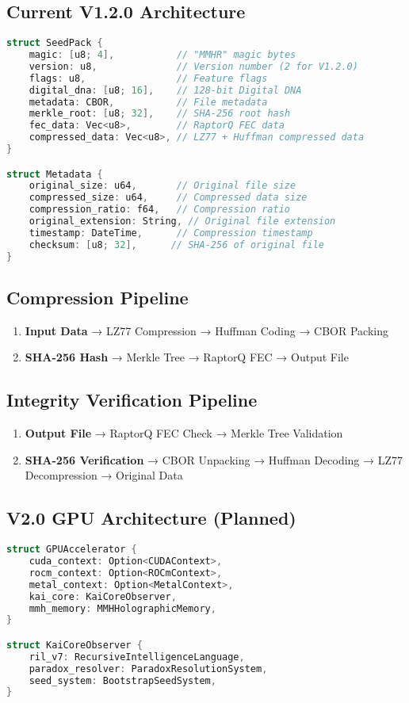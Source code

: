 \documentclass[12pt,a4paper]{article}
\begin{document}
\subsection{Current V1.2.0 Architecture}
\begin{lstlisting}[language=C, caption=Core File Format Structure]
struct SeedPack {
    magic: [u8; 4],           // "MMHR" magic bytes
    version: u8,              // Version number (2 for V1.2.0)
    flags: u8,                // Feature flags
    digital_dna: [u8; 16],    // 128-bit Digital DNA
    metadata: CBOR,           // File metadata
    merkle_root: [u8; 32],    // SHA-256 root hash
    fec_data: Vec<u8>,        // RaptorQ FEC data
    compressed_data: Vec<u8>, // LZ77 + Huffman compressed data
}

struct Metadata {
    original_size: u64,       // Original file size
    compressed_size: u64,     // Compressed data size
    compression_ratio: f64,   // Compression ratio
    original_extension: String, // Original file extension
    timestamp: DateTime,      // Compression timestamp
    checksum: [u8; 32],      // SHA-256 of original file
}
\end{lstlisting}

\subsection{Compression Pipeline}
\begin{enumerate}
    \item \textbf{Input Data} → LZ77 Compression → Huffman Coding → CBOR Packing
    \item \textbf{SHA-256 Hash} → Merkle Tree → RaptorQ FEC → Output File
\end{enumerate}

\subsection{Integrity Verification Pipeline}
\begin{enumerate}
    \item \textbf{Output File} → RaptorQ FEC Check → Merkle Tree Validation
    \item \textbf{SHA-256 Verification} → CBOR Unpacking → Huffman Decoding → LZ77 Decompression → Original Data
\end{enumerate}

\subsection{V2.0 GPU Architecture (Planned)}
\begin{lstlisting}[language=C, caption=GPU Accelerator Structure]
struct GPUAccelerator {
    cuda_context: Option<CUDAContext>,
    rocm_context: Option<ROCmContext>,
    metal_context: Option<MetalContext>,
    kai_core: KaiCoreObserver,
    mmh_memory: MMHHolographicMemory,
}

struct KaiCoreObserver {
    ril_v7: RecursiveIntelligenceLanguage,
    paradox_resolver: ParadoxResolutionSystem,
    seed_system: BootstrapSeedSystem,
}
\end{lstlisting}
\end{document}
